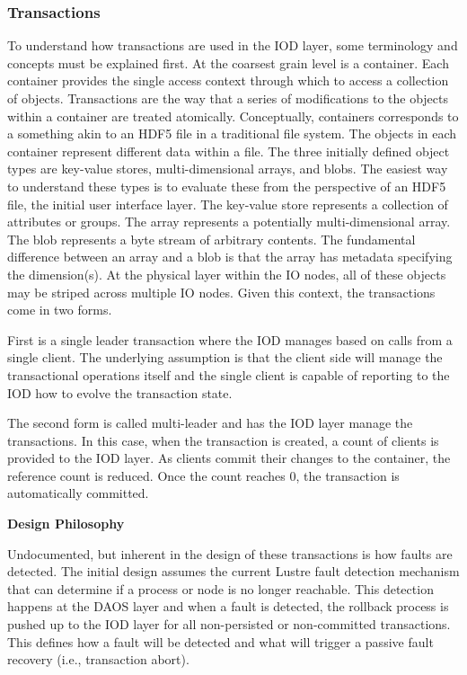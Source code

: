 \documentclass[conference]{IEEEtran}
\begin{document}
\subsubsection{Transactions}
To understand how transactions are used in the IOD layer, some terminology and
concepts must be explained first. At the coarsest grain level is a container.
Each container provides the single access context through which to access a
collection of objects. Transactions are the way that a series of modifications
to the objects within a container are treated atomically. Conceptually,
containers corresponds to a something akin to an HDF5 file in a traditional
file system. The objects in each container represent different data within a
file.  The three initially defined object types are key-value stores,
multi-dimensional arrays, and blobs.  The easiest way to understand these types
is to evaluate these from the perspective of an HDF5 file, the initial user
interface layer. The key-value store represents a collection of attributes or
groups. The array represents a potentially multi-dimensional array.  The blob
represents a byte stream of arbitrary contents.  The fundamental difference
between an array and a blob is that the array has metadata specifying the
dimension(s). At the physical layer within the IO nodes, all of these objects
may be striped across multiple IO nodes.  Given this context, the transactions
come in two forms.

First is a single leader transaction where the IOD manages based on calls from
a single client. The underlying assumption is that the client side will manage
the transactional operations itself and the single client is capable of
reporting to the IOD how to evolve the transaction state. 

The second form is called multi-leader and has the IOD layer manage the
transactions. In this case, when the transaction is created, a count of clients
is provided to the IOD layer. As clients commit their changes to the container,
the reference count is reduced. Once the count reaches 0, the transaction is
automatically committed.

\noindent\textbf{Design Philosophy}

Undocumented, but inherent in the design of these transactions is how faults
are detected. The initial design assumes the current Lustre fault detection
mechanism that can determine if a process or node is no longer reachable. This
detection happens at the DAOS layer and when a fault is detected, the rollback
process is pushed up to the IOD layer for all non-persisted or non-committed
transactions. This defines how a fault will be detected and what will trigger a
passive fault recovery (i.e., transaction abort).
\end{document}
